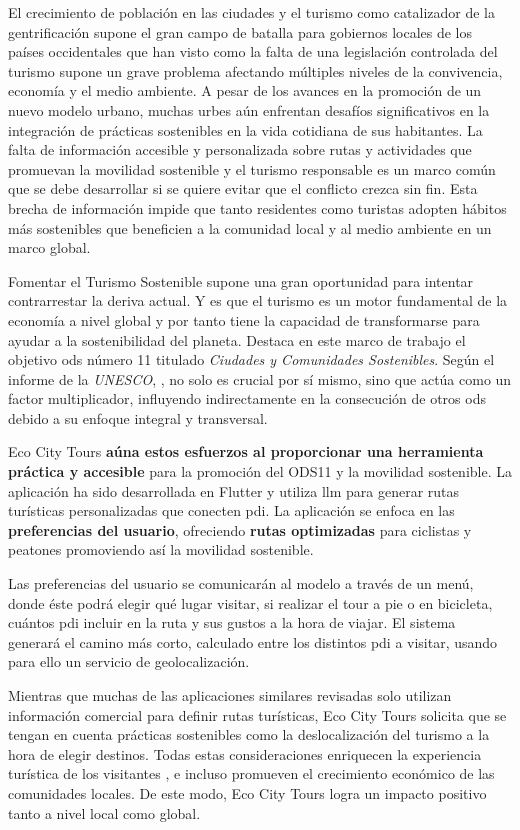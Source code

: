 
El crecimiento de población en las ciudades \cite{nieuwenhuijsen_urban_2020} y el turismo como catalizador de la gentrificación supone el gran campo de batalla para gobiernos locales de los países occidentales que han visto como la falta de una legislación controlada del turismo supone un grave problema afectando múltiples niveles de la convivencia, economía y el medio ambiente. A pesar de los avances en la promoción de un nuevo modelo urbano, muchas urbes aún enfrentan desafíos significativos en la integración de prácticas sostenibles en la vida cotidiana de sus habitantes. La falta de información accesible y personalizada sobre rutas y actividades que promuevan la movilidad sostenible y el turismo responsable es un marco común que se debe desarrollar si se quiere evitar que el conflicto crezca sin fin. Esta brecha de información impide que tanto residentes como turistas adopten hábitos más sostenibles que beneficien a la comunidad local y al medio ambiente en un marco global.

Fomentar el Turismo Sostenible supone una gran oportunidad para intentar contrarrestar la deriva actual. Y es que el turismo es un motor fundamental de la economía a nivel global y por tanto tiene la capacidad de transformarse para ayudar a la sostenibilidad del planeta.  Destaca en este marco de trabajo el  objetivo \acrshort{ods} número 11 titulado \textit{Ciudades y Comunidades Sostenibles}. Según el informe de la \textit{UNESCO}, \cite{ionescu_progress_2024}, no solo es crucial por sí mismo, sino que actúa como un factor multiplicador, influyendo indirectamente en la consecución de otros \acrshort{ods} debido a su enfoque integral y transversal.

Eco City Tours \textbf{aúna estos esfuerzos al proporcionar una herramienta práctica y accesible} para la promoción del ODS11 y la movilidad sostenible. La aplicación ha sido desarrollada en Flutter y utiliza \acrfull{llm} para generar rutas turísticas personalizadas que conecten \acrlong{pdi}. La aplicación se enfoca en las \textbf{preferencias del usuario}, ofreciendo \textbf{rutas optimizadas} para ciclistas y peatones promoviendo así la movilidad sostenible.

Las preferencias del usuario se comunicarán al modelo a través de un menú, donde éste podrá elegir qué lugar visitar, si realizar el tour a pie o en bicicleta, cuántos \acrlong{pdi} incluir en la ruta y sus gustos a la hora de viajar. El sistema generará el camino más corto, calculado entre los distintos \acrshort{pdi} a visitar, usando para ello un servicio de geolocalización.

Mientras que muchas de las aplicaciones similares revisadas solo utilizan información comercial para definir rutas turísticas, Eco City Tours solicita que se tengan en cuenta prácticas sostenibles como la deslocalización del turismo a la hora de elegir destinos. Todas estas consideraciones enriquecen la experiencia turística de los visitantes \cite{mitas_tell_2023}, e incluso promueven el crecimiento económico de las comunidades locales. De este modo, Eco City Tours logra un impacto positivo tanto a nivel local como global.